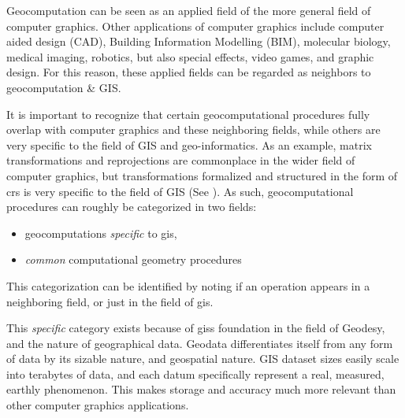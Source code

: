 Geocomputation can be seen as an applied field of the more general field of computer graphics. 
Other applications of computer graphics include computer aided design (CAD), Building Information Modelling (BIM), molecular biology, medical imaging, robotics, but also special effects, video games, and graphic design.
For this reason, these applied fields can be regarded as neighbors to geocomputation \& GIS. 

It is important to recognize that certain geocomputational procedures fully overlap with computer graphics and these neighboring fields, while others are very specific to the field of GIS and geo-informatics.
As an example, matrix transformations and reprojections are commonplace in the wider field of computer graphics, but transformations formalized and structured in the form of \ac*{crs} is very specific to the field of GIS (See ).
As such, geocomputational procedures can roughly be categorized in two fields: 
\begin{itemize}[-]
  \item geocomputations \emph{specific} to \ac{gis},
  \item \emph{common} computational geometry procedures
\end{itemize}
This categorization can be identified by noting if an operation appears in a neighboring field, or just in the field of \ac{gis}.

This \emph{specific} category exists because of \ac{gis}s foundation in the field of Geodesy, and the nature of geographical data. 
Geodata differentiates itself from any form of data by its sizable nature, and geospatial nature. 
GIS dataset sizes easily scale into terabytes of data, and each datum specifically represent a real, measured, earthly phenomenon.
This makes storage and accuracy much more relevant than other computer graphics applications. 



